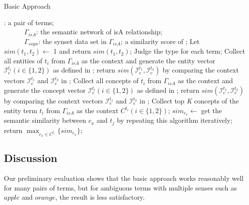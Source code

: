 \renewcommand\algorithmicrequire{\textbf{Input:}}
\renewcommand\algorithmicensure {\textbf{Output:}}
\begin{algorithm}[th]
\caption{Basic Approach}
\label{alg:baseline}
\begin{algorithmic}[1]
\REQUIRE {}: a pair of terms;\\
~~~~~~$\Gamma_{isA}$: the semantic network of isA relationship;\\
~~~~~~$\Gamma_{ssyn}$: the synset data set in $\Gamma_{isA}$;
\ENSURE a similarity score of ;
\STATE Let $sim(t_1, t_2) \leftarrow $ 1 and return $sim(t_1, t_2)$;
\ENDIF
\STATE Judge the type for each term;
\STATE Collect all entities of $t_i$ from $\Gamma_{isA}$ as the context and generate the entity vector $\mathcal{I}_c^{t_i}(i\in\{1, 2\})$ as defined in ;
\STATE return $sim(\mathcal{I}_c^{t_1}, \mathcal{I}_c^{t_2})$ by comparing the context vectors $\mathcal{I}_c^{t_1}$ and $\mathcal{I}_c^{t_2}$ in ;
\ENDIF
{}
\STATE Collect all concepts of $t_i$ from $\Gamma_{isA}$ as the context and generate the concept vector $\mathcal{I}_e^{t_i}(i\in\{1, 2\})$ as defined in ;
\STATE return $sim(\mathcal{I}_e^{t_1}, \mathcal{I}_e^{t_2})$ by comparing the context vectors $\mathcal{I}_e^{t_1}$ and $\mathcal{I}_e^{t_2}$ in ;
\ENDIF
{}
\STATE Collect top \emph{K} concepts of the entity term $t_i$ from $\Gamma_{isA}$ as the context $C^{t_i} (i\in\{1, 2\})$;
\STATE $sim_{c_x}\leftarrow$ get the semantic similarity between $c_x$ and $t_j$ by repeating this algorithm iteratively;%
\ENDFOR
\STATE return $\max_{c_x\in C^{t_i}}\{sim_{c_x}\}$;
\ENDIF
\end{algorithmic}
\end{algorithm}

\subsection{Discussion}
Our preliminary evaluation shows that the basic approach works
reasonably well for many pairs of terms, but for ambiguous terms with
multiple senses such as $apple$ and $orange$, the result is less
satisfactory.

